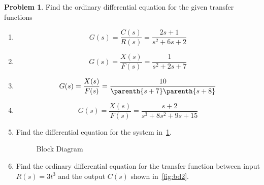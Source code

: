 \documentclass[10pt]{article}
\theoremstyle{definition}
\newtheorem{prob}{Problem}[section]
\newenvironment{subprob}%
{\renewcommand{\theenumi}{\alph{enumi}}\renewcommand{\labelenumi}{(\theenumi)}\begin{enumerate}}%
{\end{enumerate}}%
\begin{document}
\begin{prob}
    Find the ordinary differential equation for the given transfer functions
    \begin{subprob}
    \item \[ G(s) = \frac{C(s)}{R(s)} = \frac{2 s + 1}{s^2 + 6s + 2} \]
    \item \[ G(s) = \frac{X(s)}{F(s)} = \frac{1}{s^2 + 2s+7} \]
    \item \[ G(s) = \frac{X(s)}{F(s)} = \frac{10}{\parenth{s+7}\parenth{s+8}}\]
    \item \[ G(s) = \frac{X(s)}{F(s)} = \frac{s+2}{s^3 + 8s^2 + 9s+15}\]
    \item Find the differential equation for the system in~\cref{fig:blockdiagram}.
    \begin{figure}[h]
        \centering
            \caption{Block Diagram~\label{fig:blockdiagram}}
        \end{figure}

    \item Find the ordinary differential equation for the transfer function between input \( R(s) = 3 t^3 \) and the output \( C(s)\) shown in~\cref{fig:bd2}.
    \begin{figure}[h]
        \centering
        \begin{scaletikzpicturetowidth}{2\textwidth}
\end{scaletikzpicturetowidth}
\end{figure}
\end{subprob}
\end{prob}
\end{document}
